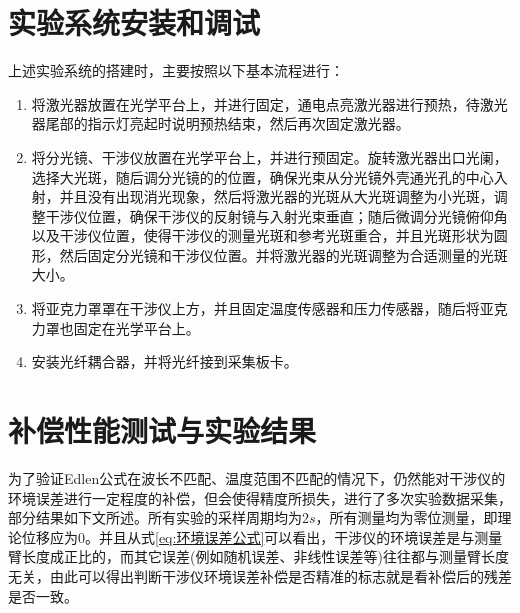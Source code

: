 \section{实验系统安装和调试}
上述实验系统的搭建时，主要按照以下基本流程进行：
\begin{enumerate}
    \item 将激光器放置在光学平台上，并进行固定，通电点亮激光器进行预热，待激光器尾部的指示灯亮起时说明预热结束，然后再次固定激光器。
    \item 将分光镜、干涉仪放置在光学平台上，并进行预固定。旋转激光器出口光阑，选择大光斑，随后调分光镜的的位置，确保光束从分光镜外壳通光孔的中心入射，并且没有出现消光现象，然后将激光器的光斑从大光斑调整为小光斑，调整干涉仪位置，确保干涉仪的反射镜与入射光束垂直；随后微调分光镜俯仰角以及干涉仪位置，使得干涉仪的测量光斑和参考光斑重合，并且光斑形状为圆形，然后固定分光镜和干涉仪位置。并将激光器的光斑调整为合适测量的光斑大小。
    \item 将亚克力罩罩在干涉仪上方，并且固定温度传感器和压力传感器，随后将亚克力罩也固定在光学平台上。
    \item 安装光纤耦合器，并将光纤接到采集板卡。
  \end{enumerate}
  \section{补偿性能测试与实验结果}
为了验证Edlen公式在波长不匹配、温度范围不匹配的情况下，仍然能对干涉仪的环境误差进行一定程度的补偿，但会使得精度所损失，进行了多次实验数据采集，部分结果如下文所述。所有实验的采样周期均为$2s$，所有测量均为零位测量，即理论位移应为0。并且从式\eqref{eq:环境误差公式}可以看出，干涉仪的环境误差是与测量臂长度成正比的，而其它误差(例如随机误差、非线性误差等)往往都与测量臂长度无关，由此可以得出判断干涉仪环境误差补偿是否精准的标志就是看补偿后的残差是否一致。


